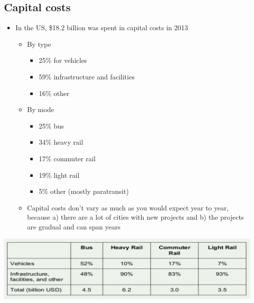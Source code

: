 \documentclass[11pt]{article}
\begin{document}
\subsection{Capital costs}
\label{sec:orga9a4735}
\begin{itemize}
\item In the US, \$18.2 billion was spent in capital costs in 2013
\begin{itemize}
\item By type
\begin{itemize}
\item 25\% for vehicles
\item 59\% infrastructure and facilities
\item 16\% other
\end{itemize}
\item By mode
\begin{itemize}
\item 25\% bus
\item 34\% heavy rail
\item 17\% commuter rail
\item 19\% light rail
\item 5\% other (mostly paratransit)
\end{itemize}
\item Capital costs don't vary as much as you would expect year to year, because a) there are a lot of cities with new projects and b) the projects are gradual and can span years
\end{itemize}
\end{itemize}

\begin{center}
\includegraphics[width=.9\linewidth]{.images/cap-cost-breakdown.png}
\end{center}
\end{document}
